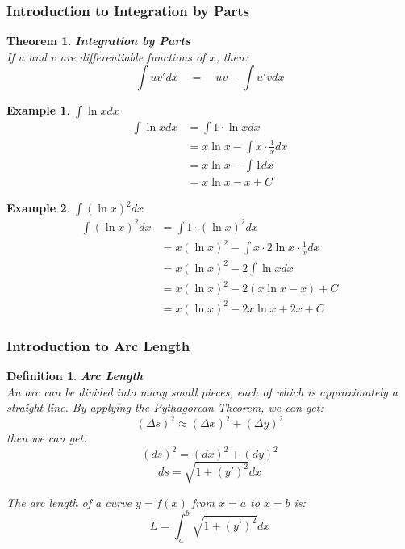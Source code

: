 \documentclass[10pt, a4paper]{article}
\newtheorem{theorem}{Theorem}
\newtheorem{definition}{Definition}
\newtheorem{example}{Example}
\begin{document}
\subsubsection*{Introduction to Integration by Parts}
\begin{theorem}
    \textbf{Integration by Parts} \\
    If $u$ and $v$ are differentiable functions of $x$, then:
    \[\boxed{\int uv'dx\quad=\quad uv-\int u'vdx}\]
\end{theorem}

\begin{example}
    \textbf{$\int \ln x dx$}
    \begin{align*}
        \int \ln x dx &= \int 1 \cdot \ln x dx \\
        &= x \ln x - \int x \cdot \frac{1}{x} dx \\
        &= x \ln x - \int 1 dx \\
        &= x \ln x - x + C
    \end{align*}
\end{example}

\begin{example}
    \textbf{$\int (\ln x)^2 dx$}
    \begin{align*}
        \int (\ln x)^2 dx &= \int 1 \cdot (\ln x)^2 dx \\
        &= x (\ln x)^2 - \int x \cdot 2 \ln x \cdot \frac{1}{x} dx \\
        &= x (\ln x)^2 - 2 \int \ln x dx \\
        &= x (\ln x)^2 - 2 (x \ln x - x) + C \\
        &= x (\ln x)^2 - 2 x \ln x + 2x + C
    \end{align*}
\end{example}

\subsubsection*{Introduction to Arc Length}
\begin{definition}
    \textbf{Arc Length} \\
    An arc can be divided into many small pieces, each of which is approximately a straight line. 
    By applying the Pythagorean Theorem, we can get:
    \[(\Delta s )^2 \approx (\Delta x)^2 + (\Delta y)^2\]
    then we can get:
    \[(ds)^2 = (dx)^2 + (dy)^2\]
    \[\boxed{ds = \sqrt{1 + (y')^2}dx}\]

    The arc length of a curve $y = f(x)$ from $x = a$ to $x = b$ is:
    \[\boxed{L = \int_a^b \sqrt{1 + (y')^2}dx}\]
\end{definition}
\end{document}
